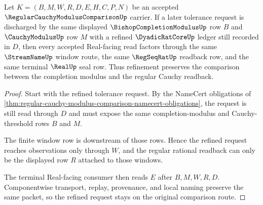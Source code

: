\begin{theorem}
\label{thm:regular-cauchy-modulus-comparison-stability}
Let $K=(B,M,W,R,D,E,H,C,P,N)$ be an accepted $\RegularCauchyModulusComparisonUp$ carrier. If a later tolerance request is discharged by the same displayed $\BishopCompletionModulusUp$ row $B$ and $\CauchyModulusUp$ row $M$ with a refined $\DyadicRatCoreUp$ ledger still recorded in $D$, then every accepted Real-facing read factors through the same $\StreamNameUp$ window route, the same $\RegSeqRatUp$ readback row, and the same terminal $\RealUp$ seal row. Thus refinement preserves the comparison between the completion modulus and the regular Cauchy readback.
\end{theorem}
\begin{proof}
Start with the refined tolerance request. By the NameCert obligations of \autoref{thm:regular-cauchy-modulus-comparison-namecert-obligations}, the request is still read through $D$ and must expose the same completion-modulus and Cauchy-threshold rows $B$ and $M$.

The finite window row is downstream of those rows. Hence the refined request reaches observations only through $W$, and the regular rational readback can only be the displayed row $R$ attached to those windows.

The terminal Real-facing consumer then reads $E$ after $B,M,W,R,D$. Componentwise transport, replay, provenance, and local naming preserve the same packet, so the refined request stays on the original comparison route.
\end{proof}




